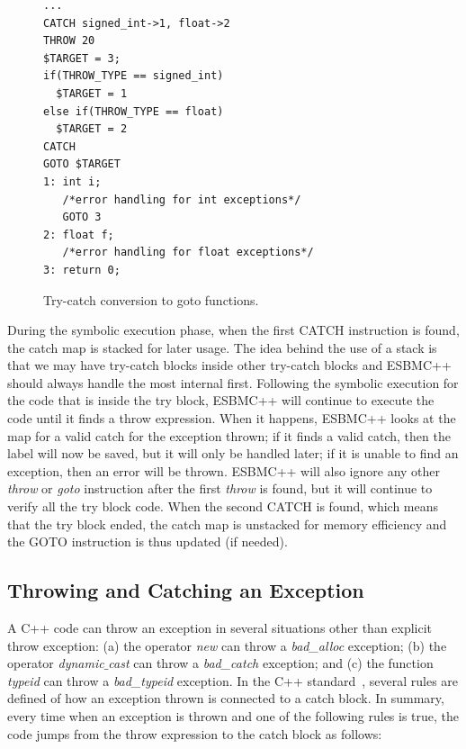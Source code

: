\documentclass[conference]{IEEEtran}
\begin{document}
\begin{figure}[ht]
\centering
\begin{minipage}{0.45\textwidth}
\begin{lstlisting}
...
CATCH signed_int->1, float->2
THROW 20
$TARGET = 3;
if(THROW_TYPE == signed_int)
  $TARGET = 1
else if(THROW_TYPE == float)
  $TARGET = 2
CATCH
GOTO $TARGET
1: int i;
   /*error handling for int exceptions*/
   GOTO 3
2: float f;
   /*error handling for float exceptions*/
3: return 0;
\end{lstlisting}
\end{minipage}
\caption{Try-catch conversion to goto functions.}
\label{figure:try-catch-goto}
\end{figure}

During the symbolic execution phase, when the first
CATCH instruction is found, the catch map is stacked
for later usage. The idea behind the use of a stack is
that we may have try-catch blocks inside other
try-catch blocks and ESBMC++ should always handle
the most internal first. Following the symbolic execution
for the code that is inside the try block, ESBMC++ will continue
to execute the code until it finds a throw expression.
When it happens, ESBMC++ looks at the map for a valid catch
for the exception thrown; if it finds a valid catch, then the label
will now be saved, but it will only be handled later;
if it is unable to find an exception, then an error will be thrown.
ESBMC++ will also ignore any other \textit{throw} or \textit{goto}
instruction after the first \textit{throw} is found, but it will continue
to verify all the try block code. When the second CATCH is found,
which means that the try block ended, the catch map is unstacked for
 memory efficiency and the GOTO instruction is thus updated (if needed).

\subsection{Throwing and Catching an Exception}

A C++ code can throw an exception in several situations other
than explicit throw exception: (a) the operator \textit{new} can throw
a \textit{bad\_alloc} exception; (b) the operator
\textit{dynamic$\_$cast} can throw a \textit{bad\_catch}
exception; and (c) the function \textit{typeid} can throw a
\textit{bad\_typeid} exception.
In the C++ standard~\cite{CppDraft},
several rules are defined of how an exception
thrown is connected to a catch block.
In summary, every time when an exception is thrown and
one of the following rules is {true}, the code jumps
from the throw expression to the catch block as follows:
\end{document}
